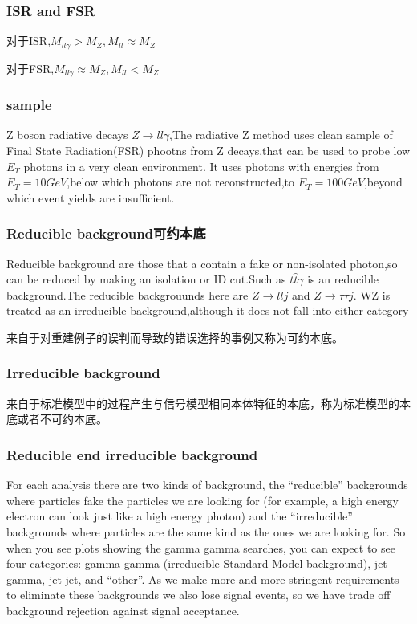 \documentclass{ctexart}
\begin{document}
\subsubsection{ISR and FSR}
对于ISR,$M_{ll\gamma}>M_Z,M_{ll}\approx M_Z$\par
对于FSR,$M_{ll\gamma}\approx M_Z,M_{ll}<M_Z$
\subsubsection{sample}
Z boson radiative  decays $Z\rightarrow ll\gamma$,The radiative Z method uses clean sample of Final State Radiation(FSR) phootns from Z decays,that can be used to probe low $E_T$ photons in a very clean environment. It uses photons with energies from $E_T=10GeV$,below which photons are not reconstructed,to $E_T=100GeV$,beyond which event yields are insufficient.
\subsubsection{Reducible background可约本底}
Reducible background are those that a contain a fake  or non-isolated photon,so can be reduced by making an isolation or ID cut.Such as $t\hat{t}\gamma$ is an reducible background.The reducible backgrouunds here are $Z\rightarrow llj$ and $Z\rightarrow\tau\tau j$. WZ is treated as an irreducible background,although it does not fall into either category\par
来自于对重建例子的误判而导致的错误选择的事例又称为可约本底。
\subsubsection{Irreducible background}
来自于标准模型中的过程产生与信号模型相同本体特征的本底，称为标准模型的本底或者不可约本底。
\subsubsection{Reducible end irreducible background}
For each analysis there are two kinds of background, the “reducible” backgrounds where particles fake the particles we are looking for (for example, a high energy electron can look just like a high energy photon) and the “irreducible” backgrounds where particles are the same kind as the ones we are looking for. So when you see plots showing the gamma gamma searches, you can expect to see four categories: gamma gamma (irreducible Standard Model background), jet gamma, jet jet, and “other”. As we make more and more stringent requirements to eliminate these backgrounds we also lose signal events, so we have trade off background rejection against signal acceptance.
\end{document}
